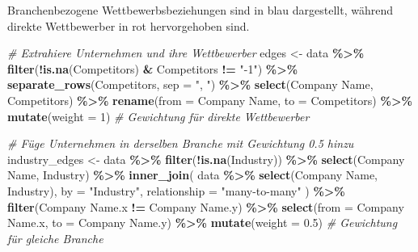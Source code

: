 \documentclass[
]{article}
\newenvironment{Shaded}{\begin{snugshade}}{\end{snugshade}}
\newcommand{\AttributeTok}[1]{\textcolor[rgb]{0.13,0.29,0.53}{#1}}
\newcommand{\CommentTok}[1]{\textcolor[rgb]{0.56,0.35,0.01}{\textit{#1}}}
\newcommand{\DecValTok}[1]{\textcolor[rgb]{0.00,0.00,0.81}{#1}}
\newcommand{\FloatTok}[1]{\textcolor[rgb]{0.00,0.00,0.81}{#1}}
\newcommand{\FunctionTok}[1]{\textcolor[rgb]{0.13,0.29,0.53}{\textbf{#1}}}
\newcommand{\NormalTok}[1]{#1}
\newcommand{\OtherTok}[1]{\textcolor[rgb]{0.56,0.35,0.01}{#1}}
\newcommand{\SpecialCharTok}[1]{\textcolor[rgb]{0.81,0.36,0.00}{\textbf{#1}}}
\newcommand{\StringTok}[1]{\textcolor[rgb]{0.31,0.60,0.02}{#1}}
\begin{document}
Branchenbezogene Wettbewerbsbeziehungen sind in blau dargestellt,
während direkte Wettbewerber in rot hervorgehoben sind.

\begin{Shaded}
\begin{Highlighting}[]
\CommentTok{\# Extrahiere Unternehmen und ihre Wettbewerber}
\NormalTok{edges }\OtherTok{\textless{}{-}}\NormalTok{ data }\SpecialCharTok{\%\textgreater{}\%}
  \FunctionTok{filter}\NormalTok{(}\SpecialCharTok{!}\FunctionTok{is.na}\NormalTok{(Competitors) }\SpecialCharTok{\&}\NormalTok{ Competitors }\SpecialCharTok{!=} \StringTok{"{-}1"}\NormalTok{) }\SpecialCharTok{\%\textgreater{}\%}
  \FunctionTok{separate\_rows}\NormalTok{(Competitors, }\AttributeTok{sep =} \StringTok{", "}\NormalTok{) }\SpecialCharTok{\%\textgreater{}\%}
  \FunctionTok{select}\NormalTok{(}\StringTok{\textasciigrave{}}\AttributeTok{Company Name}\StringTok{\textasciigrave{}}\NormalTok{, Competitors) }\SpecialCharTok{\%\textgreater{}\%}
  \FunctionTok{rename}\NormalTok{(}\AttributeTok{from =} \StringTok{\textasciigrave{}}\AttributeTok{Company Name}\StringTok{\textasciigrave{}}\NormalTok{, }\AttributeTok{to =}\NormalTok{ Competitors) }\SpecialCharTok{\%\textgreater{}\%}
  \FunctionTok{mutate}\NormalTok{(}\AttributeTok{weight =} \DecValTok{1}\NormalTok{)  }\CommentTok{\# Gewichtung für direkte Wettbewerber}

\CommentTok{\# Füge Unternehmen in derselben Branche mit Gewichtung 0.5 hinzu}
\NormalTok{industry\_edges }\OtherTok{\textless{}{-}}\NormalTok{ data }\SpecialCharTok{\%\textgreater{}\%}
  \FunctionTok{filter}\NormalTok{(}\SpecialCharTok{!}\FunctionTok{is.na}\NormalTok{(Industry)) }\SpecialCharTok{\%\textgreater{}\%}
  \FunctionTok{select}\NormalTok{(}\StringTok{\textasciigrave{}}\AttributeTok{Company Name}\StringTok{\textasciigrave{}}\NormalTok{, Industry) }\SpecialCharTok{\%\textgreater{}\%}
  \FunctionTok{inner\_join}\NormalTok{(}
\NormalTok{    data }\SpecialCharTok{\%\textgreater{}\%} \FunctionTok{select}\NormalTok{(}\StringTok{\textasciigrave{}}\AttributeTok{Company Name}\StringTok{\textasciigrave{}}\NormalTok{, Industry),}
    \AttributeTok{by =} \StringTok{"Industry"}\NormalTok{,}
    \AttributeTok{relationship =} \StringTok{"many{-}to{-}many"}
\NormalTok{  ) }\SpecialCharTok{\%\textgreater{}\%}
  \FunctionTok{filter}\NormalTok{(}\StringTok{\textasciigrave{}}\AttributeTok{Company Name.x}\StringTok{\textasciigrave{}} \SpecialCharTok{!=} \StringTok{\textasciigrave{}}\AttributeTok{Company Name.y}\StringTok{\textasciigrave{}}\NormalTok{) }\SpecialCharTok{\%\textgreater{}\%}
  \FunctionTok{select}\NormalTok{(}\AttributeTok{from =} \StringTok{\textasciigrave{}}\AttributeTok{Company Name.x}\StringTok{\textasciigrave{}}\NormalTok{, }\AttributeTok{to =} \StringTok{\textasciigrave{}}\AttributeTok{Company Name.y}\StringTok{\textasciigrave{}}\NormalTok{) }\SpecialCharTok{\%\textgreater{}\%}
  \FunctionTok{mutate}\NormalTok{(}\AttributeTok{weight =} \FloatTok{0.5}\NormalTok{)  }\CommentTok{\# Gewichtung für gleiche Branche}


\end{Highlighting}
\end{Shaded}
\end{document}
